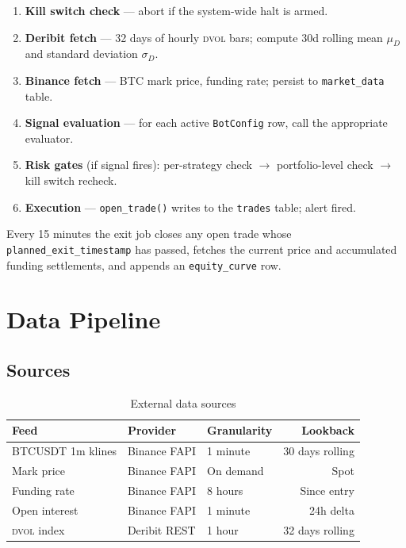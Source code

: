 \documentclass[12pt, a4paper]{article}
\theoremstyle{definition}
\newcommand{\DVOL}{\textsc{dvol}}
\begin{document}
\begin{enumerate}[leftmargin=2em]
    \item \textbf{Kill switch check} — abort if the system-wide halt is armed.
    \item \textbf{Deribit fetch} — 32 days of hourly \DVOL{} bars; compute 30d
          rolling mean $\mu_D$ and standard deviation $\sigma_D$.
    \item \textbf{Binance fetch} — BTC mark price, funding rate; persist to
          \texttt{market\_data} table.
    \item \textbf{Signal evaluation} — for each active \texttt{BotConfig} row,
          call the appropriate evaluator.
    \item \textbf{Risk gates} (if signal fires):
          per-strategy check $\rightarrow$ portfolio-level check
          $\rightarrow$ kill switch recheck.
    \item \textbf{Execution} — \texttt{open\_trade()} writes to the
          \texttt{trades} table; alert fired.
\end{enumerate}

Every 15 minutes the exit job closes any open trade whose
\texttt{planned\_exit\_timestamp} has passed, fetches the current price and
accumulated funding settlements, and appends an \texttt{equity\_curve} row.

\section{Data Pipeline}

\subsection{Sources}

\begin{table}[H]
\centering
\caption{External data sources}
\begin{tabular}{lllr}
\toprule
\textbf{Feed} & \textbf{Provider} & \textbf{Granularity} & \textbf{Lookback} \\
\midrule
BTCUSDT 1m klines    & Binance FAPI       & 1 minute  & 30 days rolling \\
Mark price           & Binance FAPI       & On demand & Spot \\
Funding rate         & Binance FAPI       & 8 hours   & Since entry \\
Open interest        & Binance FAPI       & 1 minute  & 24h delta \\
\DVOL{} index        & Deribit REST       & 1 hour    & 32 days rolling \\
\bottomrule
\end{tabular}
\end{table}
\end{document}
